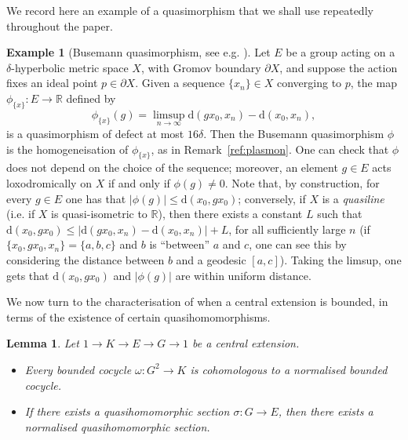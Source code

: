 \documentclass[svgnames]{amsart}
\theoremstyle{plain}
\newtheorem{lemma}[thm]{Lemma}
\theoremstyle{definition}
\newtheorem{ex}[thm]{Example}
\newcommand{\R}{\mathbb{R}}
\newcommand{\dist}{\mathrm{d}}
\begin{document}
We record here an example of a quasimorphism that we shall use repeatedly throughout the paper.
\begin{ex}[{Busemann quasimorphism, see e.g. \cite[Section 4.1]{Manning_actions_on_hyp}}]\label{ex:busemann}
    Let $E$ be a group acting on a $\delta$-hyperbolic metric space $X$, with Gromov boundary $\partial X$, and suppose the action fixes an ideal point $p\in \partial X$. Given a sequence $\{x_n\}\in X$ converging to $p$, the map $\phi_{\{x\}}\colon E\to \R$ defined by
    $$\phi_{\{x\}}(g)=\limsup_{n\to \infty} \dist(gx_0,x_n)-\dist(x_0,x_n),$$
    is a quasimorphism of defect at most $16\delta$. Then the Busemann quasimorphism $\phi$ is the homogeneisation of $\phi_{\{x\}}$, as in Remark~\ref{ref:plasmon}. One can check that $\phi$ does not depend on the choice of the sequence; moreover, an element $g\in E$ acts loxodromically on $X$ if and only if $\phi(g)\neq 0$. Note that, by construction, for every $g\in E$ one has that $|\phi(g)|\le \dist(x_0,gx_0)$; conversely, if $X$ is a \emph{quasiline} (i.e. if $X$ is quasi-isometric to $\R$), then there exists a constant $L$ such that $\dist(x_0,gx_0)\le |\dist(gx_0,x_n)-\dist(x_0,x_n)|+L$, for all sufficiently large $n$ (if $\{x_0,gx_0,x_n\}=\{a,b,c\}$ and $b$ is ``between'' $a$ and $c$, one can see this by considering the distance between $b$ and a geodesic $[a,c]$). Taking the limsup, one gets that $\dist(x_0,gx_0)$ and $|\phi(g)|$ are within uniform distance.
\end{ex}

We now turn to the characterisation of when a central extension is bounded, in terms of the existence of certain quasihomomorphisms.

\begin{lemma}
\label{lem:normalisation}
    Let $1 \to K \to E \to G \to 1$ be a central extension.
    \begin{itemize}
        \item Every bounded cocycle $\omega \colon G^2 \to K$ is cohomologous to a normalised bounded cocycle.
        \item If there exists a quasihomomorphic section $\sigma \colon G \to E$, then there exists a normalised quasihomomorphic section.
    \end{itemize}
\end{lemma}
\end{document}

